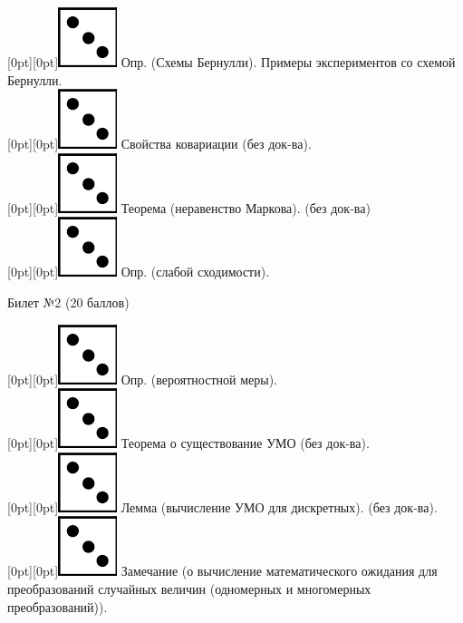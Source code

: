 \documentclass[10pt]{article}
\begin{document}
\raisebox{-1pt}[0pt][0pt]{\includegraphics[width=0.02\linewidth]{3.png}} Опр. (Схемы Бернулли). Примеры экспериментов со схемой Бернулли. \\

\raisebox{-1pt}[0pt][0pt]{\includegraphics[width=0.02\linewidth]{3.png}} Свойства ковариации (без док-ва). \\

\raisebox{-1pt}[0pt][0pt]{\includegraphics[width=0.02\linewidth]{3.png}} Теорема (неравенство Маркова). (без док-ва) \\

\raisebox{-1pt}[0pt][0pt]{\includegraphics[width=0.02\linewidth]{3.png}} Опр. (слабой сходимости). \\

\begin{center} {\Large Билет №2 (20 баллов)} \end{center}

\raisebox{-1pt}[0pt][0pt]{\includegraphics[width=0.02\linewidth]{3.png}} Опр. (вероятностной меры). \\

\raisebox{-1pt}[0pt][0pt]{\includegraphics[width=0.02\linewidth]{3.png}} Теорема о существование УМО (без док-ва). \\

\raisebox{-1pt}[0pt][0pt]{\includegraphics[width=0.02\linewidth]{3.png}} Лемма (вычисление УМО для дискретных). (без док-ва). \\

\raisebox{-1pt}[0pt][0pt]{\includegraphics[width=0.02\linewidth]{3.png}} Замечание (о вычисление  математического ожидания для преобразований случайных величин (одномерных и многомерных преобразований)). \\
\end{document}
